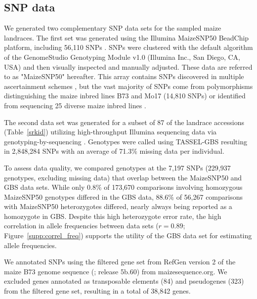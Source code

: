 \subsection*{SNP data}
We generated two complementary SNP data sets for the sampled maize landraces. 
The first set was generated using the Illumina MaizeSNP50 BeadChip platform, including 56,110 SNPs \cite[]{Ganal_2011_22174790}.  
SNPs were clustered with the default algorithm of the GenomeStudio Genotyping Module v1.0 (Illumina Inc., San Diego, CA, USA) and then visually inspected and manually adjusted.   
These data are referred to as "MaizeSNP50" hereafter.  
This array contains SNPs discovered in multiple ascertainment schemes \cite[]{Ganal_2011_22174790}, but the vast majority of SNPs come from polymorphisms distinguishing the maize inbred lines B73 and Mo17 (14,810 SNPs) or identified from sequencing 25 diverse maize inbred lines \cite[40,594 SNPs;][]{Gore20112009}.  

The second data set was generated for a subset of 87 of the landrace accessions (Table~\ref{srkid}) utilizing high-throughput Illumina sequencing data via genotyping-by-sequencing \cite[GBS;][]{Elshire2011}.
Genotypes were called using TASSEL-GBS \cite[]{Glaubitz_GBS} resulting in 2,848,284 SNPs with an average of 71.3\% missing data per individual.

To assess data quality, we compared genotypes at the 7,197 SNPs (229,937 genotypes, excluding missing data) that overlap between the MaizeSNP50 and GBS data sets. 
While only 0.8\% of 173,670  comparisons involving homozygous MaizeSNP50 genotypes differed in the GBS data, 88.6\% of 56,267 comparisons with MaizeSNP50 heterozygotes differed, nearly always being reported as a homozygote in GBS.
Despite this high heterozygote error rate,  the high correlation in allele frequencies between data sets ($r=0.89$; Figure~\ref{supp:correl_freq}) supports the utility of the GBS data set for estimating allele frequencies.  

We annotated SNPs using the filtered gene set from RefGen version 2 of the maize B73 genome sequence (\citealt{Schnable_2009_19965430}; release 5b.60) from maizesequence.org.  
We excluded genes annotated as transposable elements (84) and pseudogenes (323) from the filtered gene set, resulting in a total of 38,842 genes.

